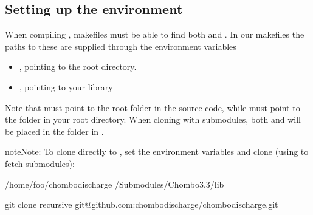 \documentclass[letterpaper,10pt,english]{sphinxmanual}
\begin{document}
\subsection{Setting up the environment}
\label{\detokenize{Base/Installation:setting-up-the-environment}}
When compiling , makefiles must be able to find both  and .
In our makefiles the paths to these are supplied through the environment variables
\begin{itemize}
\item {} 
, pointing to the  root directory.

\item {} 
, pointing to your  library

\end{itemize}

Note that  must point to the root folder in the  source code, while  must point to the  folder in your  root directory.
When cloning with submodules, both  and  will be placed in the  folder in .

\begin{sphinxadmonition}{note}{Note:}
To clone  directly to , set the environment variables and clone (using  to fetch submodules):

\begin{sphinxVerbatim}[commandchars=\\\{\},formatcom=\scriptsize]
 /home/foo/chombo\PYGZhy{}discharge
 /Submodules/Chombo\PYGZhy{}3.3/lib

git clone \PYGZhy{}\PYGZhy{}recursive git@github.com:chombo\PYGZhy{}discharge/chombo\PYGZhy{}discharge.git 
\end{sphinxVerbatim}
\end{sphinxadmonition}
\end{document}
